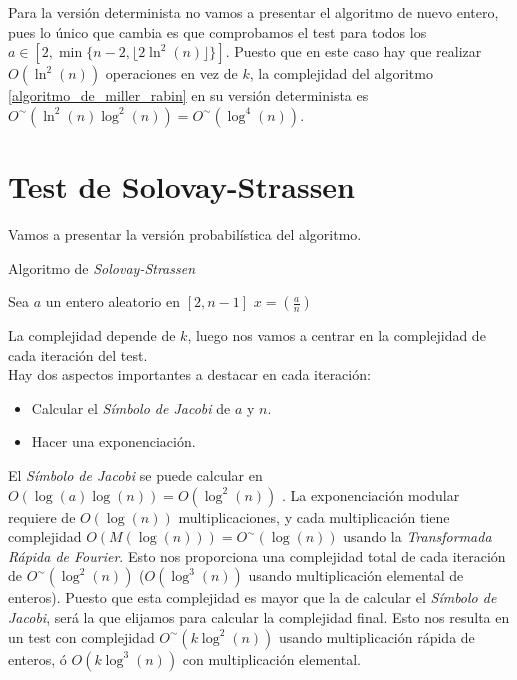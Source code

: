 Para la versión determinista no vamos a presentar el algoritmo de nuevo entero, pues lo único que cambia es que comprobamos el test para todos los $a \in [2, \min\{n-2, \lfloor 2\ln^2(n)\rfloor\}]$. Puesto que en este caso hay que realizar $O(\ln^2(n))$ operaciones en vez de $k$, la complejidad del algoritmo \autoref{algoritmo_de_miller_rabin} en su versión determinista es $O^\sim(\ln^2(n)\log^2(n)) = O^\sim(\log^4(n))$.

\section{Test de Solovay-Strassen}

Vamos a presentar la versión probabilística del algoritmo.

\begin{algorithm}[H]
	\caption{Algoritmo de \textit{Solovay-Strassen}}\label{algoritmo_de_solovay_strassen}
	\begin{algorithmic}[1]
				\State Sea $a$ un entero aleatorio en $[2, n-1]$
				\State $x = \left(\frac{a}{n}\right)$
					\State {}
				\EndIf
			\EndFor
			\State {}
		\EndProcedure
	\end{algorithmic}
\end{algorithm}

La complejidad depende de $k$, luego nos vamos a centrar en la complejidad de cada iteración del test.\\

Hay dos aspectos importantes a destacar en cada iteración:

\begin{itemize}
	\item Calcular el \textit{Símbolo de Jacobi} de $a$ y $n$.
	
	\item Hacer una exponenciación.
\end{itemize}

El \textit{Símbolo de Jacobi} se puede calcular en $O(\log(a)\log(n)) = O(\log^2(n))$ \cite{cohen_1993}. La exponenciación modular requiere de $O(\log(n))$ multiplicaciones, y cada multiplicación tiene complejidad $O(M(\log(n))) = O^\sim(\log(n))$ usando la \textit{Transformada Rápida de Fourier}. Esto nos proporciona una complejidad total de cada iteración de $O^\sim(\log^2(n))$ ($O(\log^3(n))$ usando multiplicación elemental de enteros). Puesto que esta complejidad es mayor que la de calcular el \textit{Símbolo de Jacobi}, será la que elijamos para calcular la complejidad final. Esto nos resulta en un test con complejidad $O^\sim(k\log^2(n))$ usando multiplicación rápida de enteros, ó $O(k\log^3(n))$ con multiplicación elemental.\\

